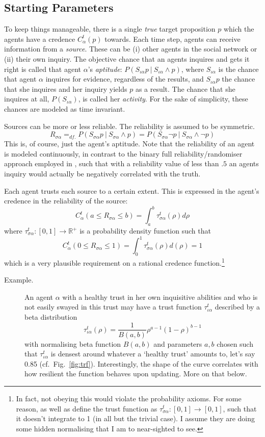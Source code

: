 \documentclass[11pt, a4paper]{article}
\newcommand{\Ssa}{S_{\sigma\alpha}}
\newcommand{\sa}{{\sigma\alpha}}
\newcommand{\given}[1][]{\:#1\vert\:}
\renewcommand{\i}[1]{\emph{#1}}
\begin{document}
\subsection{Starting Parameters}

To keep things manageable, there is a single \i{true} target proposition $p$ which the agents have a credence $C^t_\alpha(p)$ towards. Each time step, agents can receive information from a \i{source}. These can be (i) other agents in the social network or (ii) their own inquiry. The objective chance that an agents inquires and gets it right is called that agent $\alpha$'s \i{aptitude}: $P(S_{\iota \alpha}p \given S_{\iota \alpha} \land p)$, where $S_{\iota \alpha}$ is the chance that agent $\alpha$ inquires for evidence, regardless of the results, and $S_{\iota \alpha} p$ the chance that she inquires and her inquiry yields $p$ as a result. The chance that she inquires at all, $P(S_{\iota \alpha})$, is called her \i{activity}. For the sake of simplicity, these chances are modeled as time invariant.

Sources can be more or less reliable. The reliability is assumed to be symmetric.
\[ 
R_{\sigma \alpha} =_{df.} P(\Ssa p \given \Ssa \land p) = P(\Ssa \neg p \given \Ssa \land \neg p)
\]
This is, of course, just the agent's aptitude. Note that the reliability of an agent is modeled continuously, in contrast to the binary full reliability/randomiser approach employed in \textcite[Chp. 3]{Bovens2003}, such that with a reliability value of less than $.5$ an agents inquiry would actually be negatively correlated with the truth.

Each agent trusts each source to a certain extent. This is expressed in the agent's credence in the reliability of the source:
\[ 
    C^t_{\alpha}(a \leqslant R_{\sa} \leqslant b) = \int_a^b \tau^t_{\sa}(\rho) d\rho
\]
where $\tau^t_{\sa}: [0,1] \rightarrow \mathbb{R}^+$ is a probability density function such that 
\[
    C^t_{\alpha}(0 \leqslant R_{\sa} \leqslant 1) =  \int_0^1 \tau^t_{\sa} (\rho) d(\rho) = 1
\]which is a very plausible requirement on a rational credence function.\footnote{In fact, not obeying this would violate the probability axioms. For some reason, \textcite{Angere2010} as well as \textcite{Olsson2013} define the trust function as $\tau^t_{\sa}: [0,1] \rightarrow [0,1]$, such that it doesn't integrate to 1 (in all but the trivial case). I assume they are doing some hidden normalising that I am to near-sighted to see.}

\begin{description}
    \item[Example.] An agent $\alpha$ with a healthy trust in her own inquisitive abilities and who is not easily swayed in this trust may have a trust function $\tau^t_{\iota\alpha}$ described by a beta distribution
\[
    \tau^t_{\iota\alpha} (\rho) = \frac{1}{B(a,b)} \rho^{a - 1} {(1 - \rho)}^{b-1}
\]
with normalising beta function $B(a,b)$ and parameters $a, b$ chosen such that $\tau^t_{\iota\alpha}$ is densest around whatever a `healthy trust' amounts to, let's say 0.85 (cf.~Fig.~\ref{fig:trf}). Interestingly, the shape of the curve correlates with how resilient the function behaves upon updating. More on that below.
\end{description}
\end{document}
